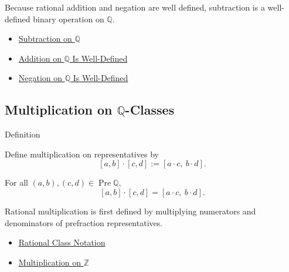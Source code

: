 \begin{remark*}[Interpretation]
Because rational addition and negation are well defined, subtraction is a
well-defined binary operation on $\mathbb{Q}$.
\end{remark*}

\begin{dependencies}
\begin{itemize}
  \item \hyperref[def:subtraction-on-q]{Subtraction on $\mathbb{Q}$}
  \item \hyperref[thm:addition-on-q-well-defined]{Addition on $\mathbb{Q}$ Is Well-Defined}
  \item \hyperref[thm:negation-on-q-well-defined]{Negation on $\mathbb{Q}$ Is Well-Defined}
\end{itemize}
\end{dependencies}

\subsection*{\texorpdfstring{Multiplication on $\mathbb{Q}$-Classes}{Multiplication on Q-Classes}}

\begin{definitionbox}{Definition}
\begin{definition}
\label{def:multiplication-on-q-classes}
Define multiplication on representatives by
\[
[a,b]\cdot[c,d]:=[a\cdot c,\ b\cdot d].
\]
\end{definition}
\end{definitionbox}

\begin{remark*}
For all $(a,b),(c,d)\in\operatorname{Pre}\mathbb{Q}$,
\[
[a,b]\cdot[c,d]=[a\cdot c,\ b\cdot d].
\]
\end{remark*}

\begin{remark*}[Interpretation]
Rational multiplication is first defined by multiplying numerators and
denominators of prefraction representatives.
\end{remark*}

\begin{dependencies}
\begin{itemize}
  \item \hyperref[def:rational-class-notation]{Rational Class Notation}
  \item \hyperref[def:multiplication-on-z-classes]{Multiplication on $\mathbb{Z}$}
\end{itemize}
\end{dependencies}

